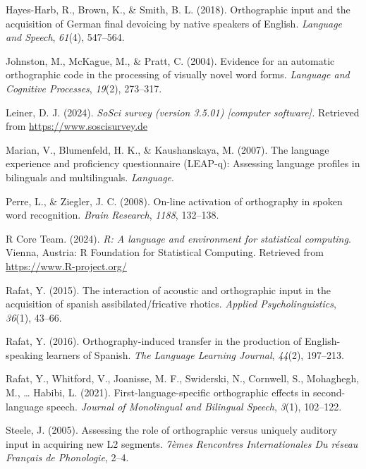 \documentclass[
  english,
  man,floatsintext]{apa7}
\newlength{\cslhangindent}
\newenvironment{CSLReferences}[2] %
 {\begin{list}{}{%
  \setlength{\itemindent}{0pt}
  \setlength{\leftmargin}{0pt}
  \setlength{\parsep}{0pt}
  \ifodd #1
   \setlength{\leftmargin}{\cslhangindent}
   \setlength{\itemindent}{-1\cslhangindent}
  \fi
  \setlength{\itemsep}{#2\baselineskip}}}
 {\end{list}}
\begin{document}
\begin{CSLReferences}{1}{0}
Hayes-Harb, R., Brown, K., \& Smith, B. L. (2018). Orthographic input and the acquisition of {G}erman final devoicing by native speakers of {E}nglish. \emph{Language and Speech}, \emph{61}(4), 547--564.

Johnston, M., McKague, M., \& Pratt, C. (2004). Evidence for an automatic orthographic code in the processing of visually novel word forms. \emph{Language and Cognitive Processes}, \emph{19}(2), 273--317.

Leiner, D. J. (2024). \emph{SoSci survey (version 3.5.01) {[}computer software{]}.} Retrieved from \url{https://www.soscisurvey.de}

Marian, V., Blumenfeld, H. K., \& Kaushanskaya, M. (2007). The language experience and proficiency questionnaire (LEAP-q): Assessing language profiles in bilinguals and multilinguals. \emph{Language}.

Perre, L., \& Ziegler, J. C. (2008). On-line activation of orthography in spoken word recognition. \emph{Brain Research}, \emph{1188}, 132--138.

R Core Team. (2024). \emph{R: A language and environment for statistical computing}. Vienna, Austria: R Foundation for Statistical Computing. Retrieved from \url{https://www.R-project.org/}

Rafat, Y. (2015). The interaction of acoustic and orthographic input in the acquisition of spanish assibilated/fricative rhotics. \emph{Applied Psycholinguistics}, \emph{36}(1), 43--66.

Rafat, Y. (2016). Orthography-induced transfer in the production of {E}nglish-speaking learners of {S}panish. \emph{The Language Learning Journal}, \emph{44}(2), 197--213.

Rafat, Y., Whitford, V., Joanisse, M. F., Swiderski, N., Cornwell, S., Mohaghegh, M., \ldots{} Habibi, L. (2021). First-language-specific orthographic effects in second-language speech. \emph{Journal of Monolingual and Bilingual Speech}, \emph{3}(1), 102--122.

Steele, J. (2005). Assessing the role of orthographic versus uniquely auditory input in acquiring new L2 segments. \emph{7{è}mes Rencontres Internationales Du r{é}seau Fran{ç}ais de Phonologie}, 2--4.


\end{CSLReferences}
\end{document}
